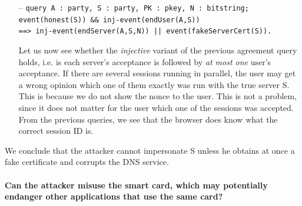 \begin{itemize}
\item[--] \texttt{query A : party, S : party, PK : pkey, N : bitstring;\\
                 event(honest(S)) \&\& inj-event(endUser(A,S))\\
                 ==> inj-event(endServer(A,S,N)) || event(fakeServerCert(S)).}

Let us now see whether the \emph{injective} variant of the previous agreement query holds, i.e. is each server's acceptance is followed by \emph{at most one} user's acceptance. If there are several sessions running in parallel, the user may get a wrong opinion which one of them exactly was run with the true server S. This is because we do not show the nonce  to the user. This is not a problem, since it does not matter for the user which one of the sessions was accepted. From the previous queries, we see that the browser does know what the correct session ID is.

\end{itemize}

We conclude that the attacker cannot impersonate S unless he obtains at once a fake certificate and corrupts the DNS service. %

\paragraph{Can the attacker misuse the smart card, which may potentially endanger other applications that use the same card?}

